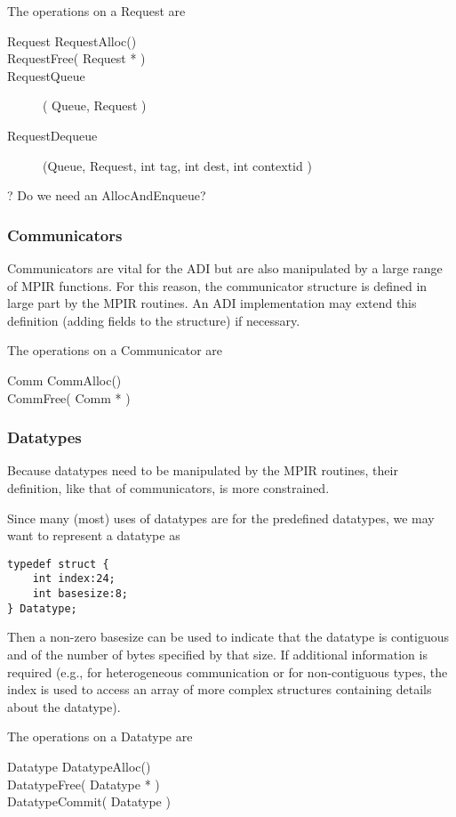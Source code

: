 \documentclass{article}
\begin{document}
The operations on a Request are
\begin{description}
\item[Request RequestAlloc()]
\item[RequestFree( Request * )]
\item[RequestQueue]( Queue, Request )
\item[RequestDequeue](Queue, Request, int tag, int dest, int contextid )
\end{description}
? Do we need an AllocAndEnqueue?

\subsubsection{Communicators}
Communicators are vital for the ADI but are also manipulated by a large range
of MPIR functions.  For this reason, the communicator structure is defined in
large part by the MPIR routines.  An ADI implementation may extend this
definition (adding fields to the structure) if necessary.

The operations on a Communicator are
\begin{description}
\item[Comm CommAlloc()]
\item[CommFree( Comm * )]
\end{description}

\subsubsection{Datatypes}
Because datatypes need to be manipulated by the MPIR routines, their
definition, like that of communicators, is more constrained.

Since many (most) uses of datatypes are for the predefined datatypes, we may
want to represent a datatype as 
\begin{verbatim}
typedef struct {
    int index:24;
    int basesize:8;
} Datatype;
\end{verbatim}
Then a non-zero basesize can be used to indicate that the datatype is
contiguous and of the number of bytes specified by that size.  If additional
information is required (e.g., for heterogeneous communication or for
non-contiguous types, the index is used to access an array of more complex
structures containing details about the datatype).

The operations on a Datatype are
\begin{description}
\item[Datatype DatatypeAlloc()]
\item[DatatypeFree( Datatype * )]
\item[DatatypeCommit( Datatype )]
\end{description}
\end{document}
